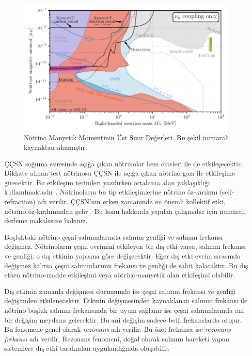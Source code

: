 \begin{figure}[hbt!]
    \centering
    \includegraphics[width=\textwidth]{figures/Brdar_2020quo_mn_vs_munu_summary.pdf}
    \caption[Nötrino Manyetik Momentinin Üst Sınır Değerleri.]{Nötrino Manyetik Momentinin Üst Sınır Değerleri. Bu şekil \cite{Brdar:2020quo} numaralı kaynaktan alınmıştır.}
    \label{fig:mu_nu}
\end{figure}

ÇÇSN soğuma evresinde açığa çıkan nötrinolar hem cinsleri ile de etkileşecektir. Dikkate alınan test nötrinosu ÇÇSN ile açığa çıkan nötrino gazı ile etkileşime girecektir. Bu etkileşim terimleri yazılırken ortalama alan yaklaşıklığı kullanılmaktadır \cite{Sigl:1993ctk, Volpe:2015rla}. Nötrinoların bu tip etkileşimlerine nötrino öz-kırılımı (self-refraction) adı verilir. ÇÇSN'nın erken zamanında en önemli kollektif etki, nötrino öz-kırılımından gelir \cite{Duan:2006an, Duan:2008fd, Pehlivan:2011hp, Volpe:2013uxl}. Bu konu hakkında yapılan çalışmalar için \cite{Duan:2010bg} numaralı derleme makalesine bakınız.

Boşluktaki nötrino çeşni salınımlarında salınım genliği ve salınım frekansı değişmez. Nötrinoların çeşni evrimini etkileyen bir dış etki varsa, salınım frekansı ve genliği, o dış etkinin yapısına göre değişecektir. Eğer dış etki evrim sırasında değişmez kalırsa çeşni salınımlarının frekansı ve genliği de sabit kalacaktır. Bu dış etken nötrino-madde etkileşimi veya nötrino-manyetik alan etkileşimi olabilir.

Dış etkinin zamanla değişmesi durumunda ise çeşni salınım frekansı ve genliği değişimden etkilenecektir. Etkinin değişmesinden kaynaklanan salınım frekansı ile nötrino boşluk salınım frekansında bir uyum sağlanır ise çeşni salınımlarında ani bir değişim meydana gelecektir. Bu ani değişim sadece belli frekanslarda oluşur. Bu fenomene genel olarak \emph{rezonans} adı verilir. Bu özel frekansa ise \emph{rezonans frekansı} adı verilir. Rezonans fenomeni, doğal olarak salınım hareketi yapan sistemlere dış etki tarafından uygulandığında oluşabilir.

